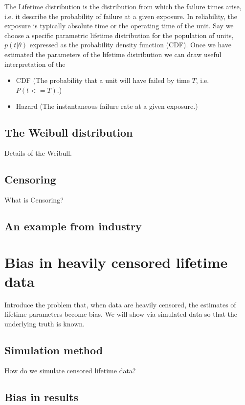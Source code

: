The Lifetime distribution is the distribution from which the failure times arise, i.e. it describe the probability of failure at a given exposure. In reliability, the exposure is typically absolute time or the operating time of the unit. Say we choose a specific parametric lifetime distribution for the population of units, $p(t|\theta)$ expressed as the probability density function (CDF). Once we have estimated the parameters of the lifetime distribution we can draw useful interpretation of the

\begin{itemize}
    \item CDF (The probability that a unit will have failed by time $T$, i.e. $P(t <= T)$.)
    \item Hazard (The instantaneous failure rate at a given exposure.)
\end{itemize}

\subsection{The Weibull distribution}

Details of the Weibull.

\subsection{Censoring}

What is Censoring?

\subsection{An example from industry}

\section{Bias in heavily censored lifetime data}

Introduce the problem that, when data are heavily censored, the estimates of lifetime parameters become bias. We will show via simulated data so that the underlying truth is known.

\subsection{Simulation method}

How do we simulate censored lifetime data?

\subsection{Bias in results}

